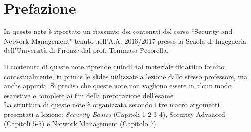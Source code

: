 \chapter*{Prefazione}
In queste note è riportato un riassunto dei contenuti del corso \textquotedblleft Security and Network Management" tenuto nell'A.A. 2016/2017 presso la Scuola di Ingegneria dell'Università di Firenze dal prof. Tommaso Pecorella.

Il contenuto di queste note riprende quindi dal materiale didattico fornito contestualmente, in primis le slides utilizzate a lezione dallo stesso professore, ma anche appunti. Si precisa che queste note non vogliono essere in alcun modo esaustive e complete ai fini della preparazione dell'esame.\\
La struttura di queste note è organizzata secondo i tre macro argomenti presentati a lezione: \textit{Security Basics} (Capitoli 1-2-3-4), Security Advanced (Capitoli 5-6) e Network Management (Capitolo 7).
